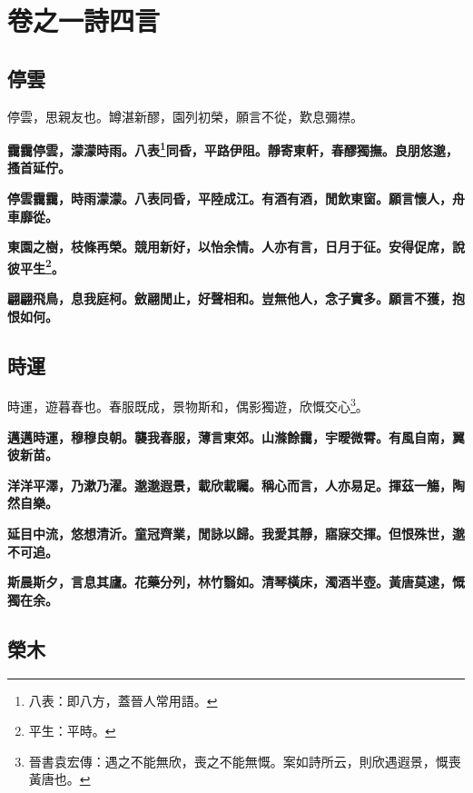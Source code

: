 \chapter{卷之一\hspace{1ex}詩四言}

\section{停雲\hspace{1ex}{\footnotesize 并序}}

\begin{quoting}停雲，思親友也。罇湛新醪，園列初榮，願言不從，歎息彌襟。\end{quoting}

\textbf{靄靄停雲，濛濛時雨。八表\footnote{八表：即八方，蓋晉人常用語。}同昏，平路伊阻。靜寄東軒，春醪獨撫。良朋悠邈，搔首延佇。}

\textbf{停雲靄靄，時雨濛濛。八表同昏，平陸成江。有酒有酒，閒飲東窗。願言懷人，舟車靡從。}

\textbf{東園之樹，枝條再榮。競用新好，以怡余情。人亦有言，日月于征。安得促席，說彼平生\footnote{平生：平時。}。}

\textbf{翩翩飛鳥，息我庭柯。斂翮閒止，好聲相和。豈無他人，念子實多。願言不獲，抱恨如何。}

\section{時運\hspace{1ex}{\footnotesize 并序}}

\begin{quoting}時運，遊暮春也。春服既成，景物斯和，偶影獨遊，欣慨交心\footnote{晉書袁宏傳：遇之不能無欣，喪之不能無慨。案如詩所云，則欣遇遐景，慨喪黃唐也。}。\end{quoting}

\textbf{邁邁時運，穆穆良朝。襲我春服，薄言東郊。山滌餘靄，宇曖微霄。有風自南，翼彼新苗。}

\textbf{洋洋平澤，乃漱乃濯。邈邈遐景，載欣載矚。稱心而言，人亦易足。揮茲一觴，陶然自樂。}

\textbf{延目中流，悠想清沂。童冠齊業，閒詠以歸。我愛其靜，寤寐交揮。但恨殊世，邈不可追。}

\textbf{斯晨斯夕，言息其廬。花藥分列，林竹翳如。清琴橫床，濁酒半壺。黃唐莫逮，慨獨在余。}

\section{榮木\hspace{1ex}{\footnotesize 并序}}

